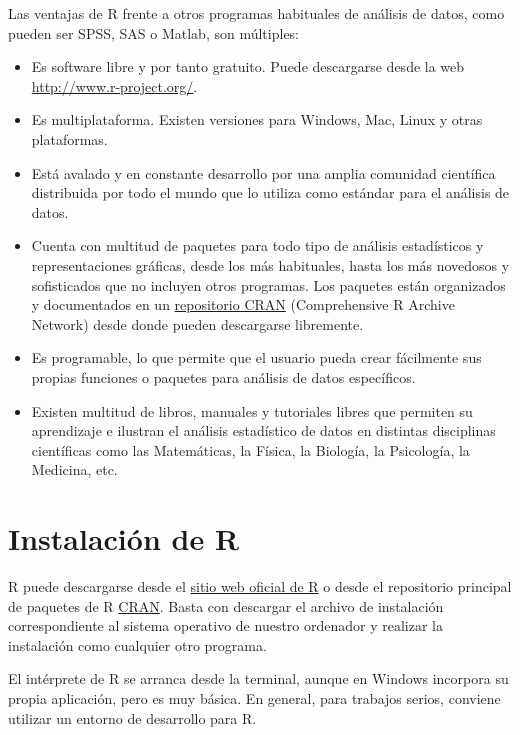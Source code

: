 \documentclass[
  spanish,
  a4paper,
]{scrreport}
\providecommand{\tightlist}{%
  \setlength{\itemsep}{0pt}\setlength{\parskip}{0pt}}
\theoremstyle{definition}
\theoremstyle{remark}
\begin{document}
Las ventajas de R frente a otros programas habituales de análisis de
datos, como pueden ser SPSS, SAS o Matlab, son múltiples:

\begin{itemize}
\tightlist
\item
  Es software libre y por tanto gratuito. Puede descargarse desde la web
  \url{http://www.r-project.org/}.
\item
  Es multiplataforma. Existen versiones para Windows, Mac, Linux y otras
  plataformas.
\item
  Está avalado y en constante desarrollo por una amplia comunidad
  científica distribuida por todo el mundo que lo utiliza como estándar
  para el análisis de datos.
\item
  Cuenta con multitud de paquetes para todo tipo de análisis
  estadísticos y representaciones gráficas, desde los más habituales,
  hasta los más novedosos y sofisticados que no incluyen otros
  programas. Los paquetes están organizados y documentados en un
  \href{https://cran.r-project.org/}{repositorio CRAN} (Comprehensive R
  Archive Network) desde donde pueden descargarse libremente.
\item
  Es programable, lo que permite que el usuario pueda crear fácilmente
  sus propias funciones o paquetes para análisis de datos específicos.
\item
  Existen multitud de libros, manuales y tutoriales libres que permiten
  su aprendizaje e ilustran el análisis estadístico de datos en
  distintas disciplinas científicas como las Matemáticas, la Física, la
  Biología, la Psicología, la Medicina, etc.
\end{itemize}

\section{Instalación de R}\label{instalaciuxf3n-de-r}

R puede descargarse desde el \href{https://www.r-project.org/}{sitio web
oficial de R} o desde el repositorio principal de paquetes de R
\href{https://cran.r-project.org/}{CRAN}. Basta con descargar el archivo
de instalación correspondiente al sistema operativo de nuestro ordenador
y realizar la instalación como cualquier otro programa.

El intérprete de R se arranca desde la terminal, aunque en Windows
incorpora su propia aplicación, pero es muy básica. En general, para
trabajos serios, conviene utilizar un entorno de desarrollo para R.
\end{document}
